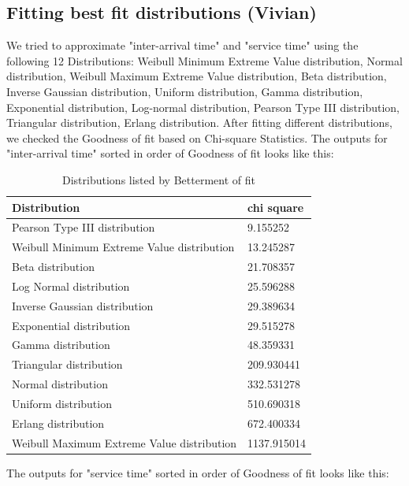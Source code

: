 \documentclass{article}
\begin{document}
\subsection{Fitting best fit distributions (Vivian)}

We tried to approximate "inter-arrival time" and "service time" using the following 12 Distributions: Weibull Minimum Extreme Value distribution, Normal distribution, Weibull Maximum Extreme Value distribution, Beta distribution, Inverse Gaussian distribution, Uniform distribution, Gamma distribution, Exponential distribution, Log-normal distribution, Pearson Type III distribution, Triangular distribution, Erlang distribution. After fitting different distributions, we checked the Goodness of fit based on Chi-square Statistics. The outputs for "inter-arrival time" sorted in order of Goodness of fit looks like this: 

\begin{table}[h!]
    \centering
    \caption{Distributions listed by Betterment of fit}
    \begin{tabu}{*{2}{X[c]}}
        \toprule
        \textbf{Distribution} & \textbf{chi square}\\
        \midrule
        Pearson Type III distribution & 9.155252\\
        Weibull Minimum Extreme Value distribution & 13.245287\\
        Beta distribution & 21.708357\\
        Log Normal distribution & 25.596288\\
        Inverse Gaussian distribution & 29.389634\\
        Exponential distribution & 29.515278\\
        Gamma distribution & 48.359331\\
        Triangular distribution & 209.930441\\
        Normal distribution & 332.531278\\
        Uniform distribution & 510.690318\\
        Erlang distribution & 672.400334\\
        Weibull Maximum Extreme Value distribution & 1137.915014\\
        \bottomrule
    \end{tabu}
    \label{tab:Inter-arrival Best Fit}
\end{table}

The outputs for "service time" sorted in order of Goodness of fit looks like this:
\end{document}
